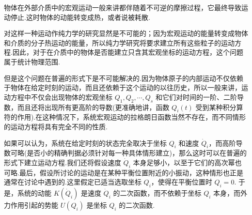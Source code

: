 物体在外部介质中的宏观运动一般来讲都伴随着不可逆的摩擦过程，它最终导致运动停止.这时物体的动能转变成热，或者说被耗散.

对这样一种运动作纯力学的研究显然是不可能的；因为宏观运动的能量转变成物体和介质的分子热运动的能量，所以纯力学研究将要求建立所有这些粒子的运动方程.因此，对于在介质中的物体是否能建立只含其宏观坐标的运动方程，这个问题属于统计物理范围.

但是这个问题在普遍的形式下是不可能解决的.因为物体原子的内部运动不仅依赖于物体在给定时刻的运动，而且还依赖于这个运动的以往历史，所以一般来讲，运动方程中不仅会出现物体的宏观坐标 $Q_1,Q_2,\cdots,Q_s$ 和它们对时间的一阶、二阶导数，而且还将出现所有更高阶的导数(更准确地讲，函数 $Q_i(t)$ 受到某种积分算符的作用).在这种情况下，系统宏观运动的拉格朗日函数当然不存在，而不同情形的运动方程将具有完全不同的性质.

如果可以认为，系统在给定时刻的状态完全取决于坐标 $Q_i$ 和速度 $\dot{Q}_i$，而高阶导数可略(是否小的精确判据必须针对每一种具体情形建立)，那么这时可以在普遍的形式下建立运动方程.我们还将假设速度 $\dot{Q}_i$ 本身足够小，以至于它们的高次幂也可略.最后，假设所讨论的运动是在某种平衡位置附近的小振动，这种情形也正是通常在讨论中遇到的.这里假定已适当选取坐标 $Q_i$，使得在平衡位置时 $Q_i=0$. 于是，系统的动能 $K(\dot{Q}_i)$ 是速度 $\dot{Q}_i$ 的二次函数，而不依赖于坐标 $Q_i$ 本身，而外力作用引起的势能 $U(Q_i)$ 是坐标 $Q_i$ 的二次函数.

